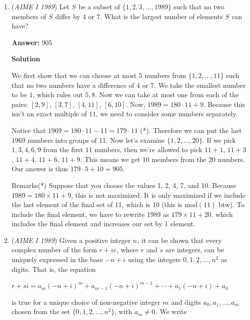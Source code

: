 \begin{enumerate}
 


	\item (\textit{AIME I 1989}) Let $S^{}_{}$ be a subset of $\{1,2,3^{}_{},\ldots,1989\}$ such that no two members of $S^{}_{}$ differ by $4$ or $7$. What is the largest number of elements $S^{}_{}$ can have?


 
 \textbf{Answer: }905



\textbf{Solution}

We first show that we can choose at most 5 numbers from $\{1, 2, \ldots , 11\}$ such that no two numbers have a difference of $4$ or $7$. We take the smallest number to be $1$, which rules out $5,8$. Now we can take at most one from each of the pairs: $[2,9]$, $[3,7]$, $[4,11]$, $[6,10]$. Now, $1989 = 180\cdot 11 + 9$. Because this isn't an exact multiple of $11$, we need to consider some numbers separately. 

 Notice that $1969 = 180\cdot11 - 11 = 179\cdot11$ (*). Therefore we can put the last $1969$ numbers into groups of 11. Now let's examine $\{1, 2, \ldots , 20\}$. If we pick $1, 3, 4, 6, 9$ from the first $11$ numbers, then we're allowed to pick $11 + 1$, $11 + 3$, $11 + 4$, $11 + 6$, $11 + 9$. This means we get 10 members from the 20 numbers. Our answer is thus $179\cdot 5 + 10 = \boxed{905}$.

 Remarks(*) Suppose that you choose the values 1, 2, 4, 7, and 10. Because $1989 = 180 \times 11 + 9$, this is not maximized. It is only maximized if we include the last element of the final set of 11, which is 10 (this is $\text{mod}(11)$ btw). To include the final element, we have to rewrite 1989 as $179 \times 11 + 20$, which includes the final element and increases our set by 1 element.

 


	\item (\textit{AIME I 1989}) Given a positive integer $n^{}_{}$, it can be shown that every complex number of the form $r+si^{}_{}$, where $r^{}_{}$ and $s^{}_{}$ are integers, can be uniquely expressed in the base $-n+i^{}_{}$ using the integers $0,1,2^{}_{},\ldots,n^2$ as digits. That is, the equation


 $r+si=a_m(-n+i)^m+a_{m-1}(-n+i)^{m-1}+\cdots +a_1(-n+i)+a_0$

 is true for a unique choice of non-negative integer $m^{}_{}$ and digits $a_0,a_1^{},\ldots,a_m$ chosen from the set $\{0^{}_{},1,2,\ldots,n^2\}$, with $a_m\ne 0^{}{}$. We write



\end{enumerate}

